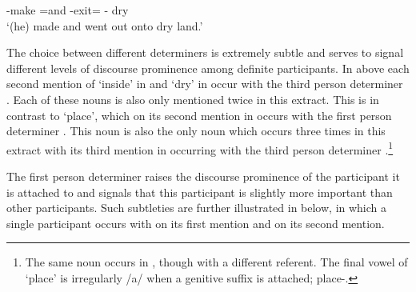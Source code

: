 \begin{exe}
\begin{xlist}
{							{\a\n}-make =and \n-exit={\een} {\n}-{\bi} {} dry\\
				\glt	{}`(he) made and went out onto dry land.' }\label{ex:120715-4, 0.37-0.47, 0.45}
		\label{ex:120715-4, 0.37-0.47, 0.45b}
		\label{ex:120715-4, 0.37-0.47, 0.47}
	\end{xlist}
\end{exe}

The choice between different determiners is extremely subtle
and serves to signal different levels of discourse prominence among definite participants.
In  above
each second mention of  `inside'
in  and  `dry'
in  occur with
the third person determiner .
Each of these nouns is also only mentioned twice in this extract.
This is in contrast to  `place', which on its second mention
in  occurs with the first person determiner .
This noun is also the only noun which occurs three times in this extract
with its third mention in 
occurring with the third person determiner .\footnote{
		The same noun occurs in ,
		though with a different referent.
		The final vowel of  `place' is irregularly /a/
		when a genitive suffix is attached;  place-{\N}.}

The first person determiner raises the discourse prominence
of the participant it is attached to and signals that this
participant is slightly more important than other participants.
Such subtleties are further illustrated in  below,
in which a single participant occurs with  {\ii} on its
first mention and  {\aan} on its second mention.

\begin{exe}
	\label{ex:130825-6}
	\begin{xlist}
		\label{ex2:130825-6, 2.06}
		\label{ex:130825-6, 2.09}
	\end{xlist}
\end{exe}


